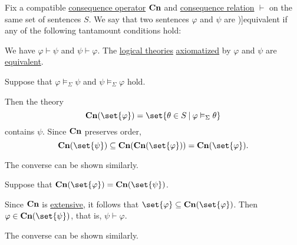 \begin{definition}\label{def:consequence_formula_equivalence}\mimprovised
  Fix a compatible \hyperref[def:consequence_operator]{consequence operator} \( \op*{Cn} \) and \hyperref[def:consequence_relation]{consequence relation} \( {\vdash} \) on the same set of sentences \( S \). We say that two sentences \( \varphi \) and \( \psi \) are \term[ru=равносильные / эквивалентные (формулы) (\cite[44]{КолмогоровДрагалин2006Логика})]{equivalent} if any of the following tantamount conditions hold:
  \begin{thmenum}
     We have \( \varphi \vdash \psi \) and \( \psi \vdash \varphi \).
     The \hyperref[def:logical_theory]{logical theories} \hyperref[def:logical_theory/generated]{axiomatized} by \( \varphi \) and \( \psi \) are \hyperref[def:logical_theory]{equivalent}.
  \end{thmenum}
\end{definition}
\begin{defproof}
   Suppose that \( \varphi \vDash_\Sigma \psi \) and \( \psi \vDash_\Sigma \varphi \) hold.

  Then the theory
  \begin{equation*}
    \op*{Cn}(\set{ \varphi }) = \set{ \theta \in S \given \varphi \vDash_\Sigma \theta }
  \end{equation*}
  contains \( \psi \). Since \( \op*{Cn} \) preserves order,
  \begin{equation*}
    \op*{Cn}(\set{ \psi }) \subseteq \op*{Cn}(\op*{Cn}(\set{ \varphi })) = \op*{Cn}(\set{ \varphi }).
  \end{equation*}

  The converse can be shown similarly.

   Suppose that \( \op*{Cn}(\set{ \varphi }) = \op*{Cn}(\set{ \psi }) \).

  Since \( \op*{Cn} \) is \hyperref[def:extensive_function]{extensive}, it follows that \( \set{ \varphi } \subseteq \op*{Cn}(\set{ \varphi }) \). Then \( \varphi \in \op*{Cn}(\set{ \psi }) \), that is, \( \psi \vdash \varphi \).

  The converse can be shown similarly.
\end{defproof}

